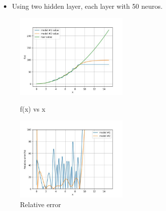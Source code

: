 \documentclass{beamer}
\begin{document}
\begin{frame}
    \frametitle{\secname}
    \begin{itemize}
        \item Using two hidden layer, each layer with 50 neuros.
    \end{itemize}

    \begin{figure}
        \begin{multicols}{2}
            \includegraphics[width=2.2in]{Figs/Value_50_2.jpg}
            \caption{f(x) vs x}
            \columnbreak

            \includegraphics[width=2.2in]{Figs/Error_50_2.jpg}
            \caption{Relative error}
        \end{multicols}
    \end{figure}
\end{frame}
\end{document}
